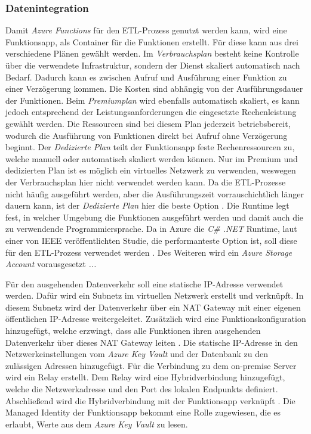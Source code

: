 \subsubsection{Datenintegration} \label{subsec:infra:konfig:functions}
Damit \textit{Azure Functions} für den ETL-Prozess genutzt werden kann, wird eine Funktionsapp, als Container für die Funktionen erstellt. Für diese kann aus drei verschiedene Plänen gewählt werden. Im \textit{Verbrauchsplan} besteht keine Kontrolle über die verwendete Infrastruktur, sondern der Dienst skaliert automatisch nach Bedarf. Dadurch kann es zwischen Aufruf und Ausführung einer Funktion zu einer Verzögerung kommen. Die Kosten sind abhängig von der Ausführungsdauer der Funktionen. Beim \textit{Premiumplan} wird ebenfalls automatisch skaliert, es kann jedoch entsprechend der Leistungsanforderungen die eingesetzte Rechenleistung gewählt werden. Die Ressourcen sind bei diesem Plan jederzeit betriebsbereit, wodurch die Ausführung von Funktionen direkt bei Aufruf ohne Verzögerung beginnt. Der \textit{Dedizierte Plan} teilt der Funktionsapp feste Rechenressourcen zu, welche manuell oder automatisch skaliert werden können. Nur im Premium und dedizierten Plan ist es möglich ein virtuelles Netzwerk zu verwenden, weswegen der Verbrauchsplan hier nicht verwendet werden kann. Da die ETL-Prozesse nicht häufig ausgeführt werden, aber die Ausführungszeit vorrauschichtlich länger dauern kann, ist der \textit{Dedizierte Plan} hier die beste Option \cite[vgl.][]{satapathi_hands-azure_2021}. Die Runtime legt fest, in welcher Umgebung die Funktionen ausgeführt werden und damit auch die zu verwendende Programmiersprache. Da in Azure die \textit{C\# .NET} Runtime, laut einer von IEEE veröffentlichten Studie, die performanteste Option ist, soll diese für den ETL-Prozess verwendet werden \cite[vgl.][]{jackson_investigation_2018}. Des Weiteren wird ein \textit{Azure Storage Account} vorausgesetzt \textit{...}

Für den ausgehenden Datenverkehr soll eine statische IP-Adresse verwendet werden. Dafür wird ein Subnetz im virtuellen Netzwerk erstellt und verknüpft. In diesem Subnetz wird der Datenverkehr über ein NAT Gateway mit einer eigenen öffentlichen IP-Adresse weitergeleitet. Zusätzlich wird eine Funktionskonfiguration hinzugefügt, welche erzwingt, dass alle Funktionen ihren ausgehenden Datenverkehr über dieses NAT Gateway leiten \cite[vgl.][]{msdoc_22_func_ip}. Die statische IP-Adresse in den Netzwerkeinstellungen vom \textit{Azure Key Vault} und der Datenbank zu den zulässigen Adressen hinzugefügt. Für die Verbindung zu dem on-premise Server wird ein Relay erstellt. Dem Relay wird eine Hybridverbindung hinzugefügt, welche die Netzwerkadresse und den Port des lokalen Endpunkts definiert. Abschließend wird die Hybridverbindung mit der Funktionsapp verknüpft \cite[vgl.][]{msdoc_22_func_hybridConn}. Die Managed Identity der Funktionsapp bekommt eine Rolle zugewiesen, die es erlaubt, Werte aus dem \textit{Azure Key Vault} zu lesen.

